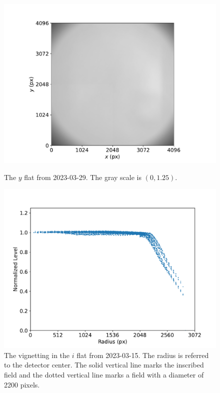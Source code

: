 \documentclass{article}
\begin{document}
\begin{figure}[pb]
\begin{center}
\includegraphics[width=0.7\columnwidth]{figures/flat-y-20230329.pdf}
\medskip
\caption{The $y$ flat from 2023-03-29. The gray scale is $(0,1.25)$.}
\label{figure:flat-y-20230329}
\label{figure:flat-last}
\end{center}
\end{figure}

\begin{figure}[pb]
\begin{center}
\includegraphics[width=0.7\columnwidth]{figures/flat-vignetting.pdf}
\medskip
\caption{The vignetting in the $i$ flat from 2023-03-15. The radius is referred to the detector center. The solid vertical line marks the inscribed field and the dotted vertical line marks a field with a diameter of 2200 pixels.}
\label{figure:flat-vignetting}
\end{center}
\end{figure}
\end{document}
